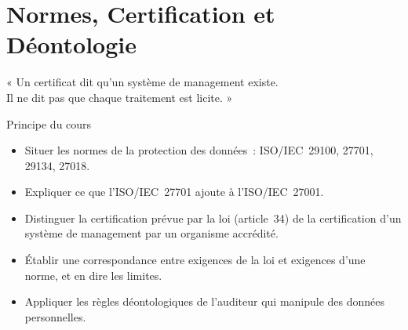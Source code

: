 
\chapter{Normes, Certification et Déontologie}
\label{chap:normes}

\epigraph{%
    « Un certificat dit qu'un système de management existe.\\
    Il ne dit pas que chaque traitement est licite. »%
}{Principe du cours}


\begin{boxobjectifs}
\begin{itemize}
    \item Situer les normes de la protection des données~: ISO/IEC~29100,
          27701, 29134, 27018.
    \item Expliquer ce que l'ISO/IEC~27701 ajoute à l'ISO/IEC~27001.
    \item Distinguer la certification prévue par la loi (article~34) de la
          certification d'un système de management par un organisme
          accrédité.
    \item Établir une correspondance entre exigences de la loi et
          exigences d'une norme, et en dire les limites.
    \item Appliquer les règles déontologiques de l'auditeur qui manipule
          des données personnelles.
\end{itemize}
\end{boxobjectifs}

\bigskip


